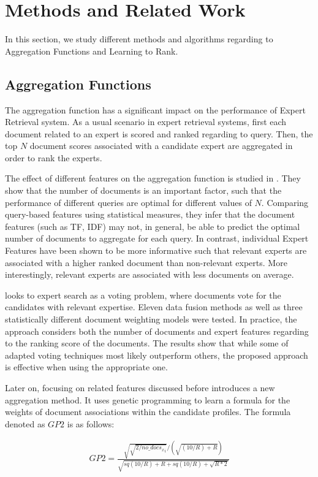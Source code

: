 \section{Methods and Related Work}
\label{sec:methods}
In this section, we study different methods and algorithms regarding to Aggregation Functions and Learning to Rank.

\subsection{Aggregation Functions}
The aggregation function has a significant impact on the performance of Expert Retrieval system. As a usual scenario in expert retrieval systems, first each document related to an expert is scored and ranked regarding to query. Then, the top $N$ document scores associated with a candidate expert are aggregated in order to rank the experts. 

The effect of different features on the aggregation function is studied in \cite{agg-gp2}. They show that the number of documents is an important factor, such that the performance of different queries are optimal for different values of $N$. Comparing query-based features using statistical measures, they infer that the document features (such as TF, IDF) may not, in general, be able to predict the optimal number of documents to aggregate for each query. In contrast, individual Expert Features have been shown to be more informative such that relevant experts are associated with a higher ranked document than non-relevant experts. More interestingly, relevant experts are associated with less documents on average.

\cite{agg-vote} looks to expert search as a voting problem, where documents vote for the candidates with relevant expertise. Eleven data fusion methods as well as three statistically different document weighting models were tested. In practice, the approach considers both the number of documents and expert features regarding to the ranking score of the documents. The results show that while some of adapted voting techniques most likely outperform others, the proposed approach is effective when using the appropriate one.

Later on, focusing on related features discussed before \cite{agg-gp2} introduces a new aggregation method. It uses genetic programming to learn a formula for the weights of document associations within the candidate profiles. The formula denoted as $GP2$ is as follows:

\begin{align*}
GP2 = \frac{\sqrt{\sqrt{2/{no\_docs_x}_i}}/(\sqrt{(10/R)+R})}{\sqrt{sq(10/R)+R+sq(10/R)+\sqrt{R*2}}}
\end{align*}

